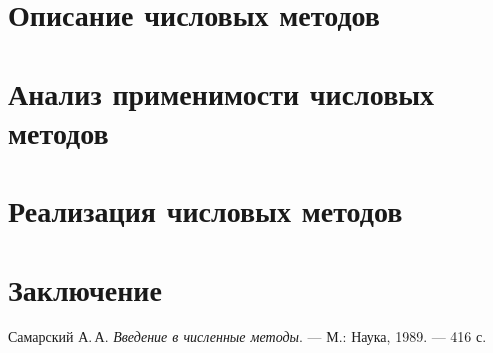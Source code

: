 \documentclass[a4paper, fleqn]{report}
\begin{document}
\chapter*{Описание числовых методов}


\chapter*{Анализ применимости числовых методов}


\chapter*{Реализация числовых методов}


\chapter*{Заключение}


\begin{thebibliography}{1}
\renewcommand{\bibname}{Литература}
 Самарский А.\,А. \textit{Введение в численные методы}. — М.: Наука, 1989. — 416 с.
\end{thebibliography}
\end{document}
